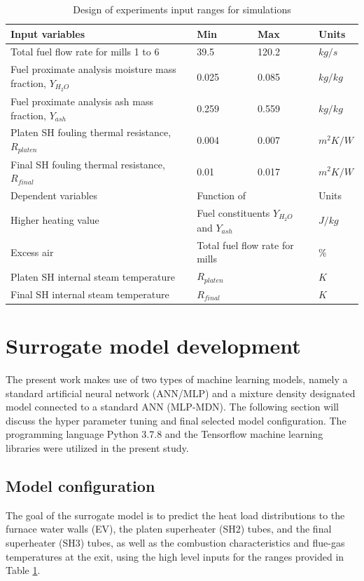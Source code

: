 \documentclass[a4paper,fleqn]{cas-dc}
\begin{document}
\begin{table}[h!]
\caption{Design of experiments input ranges for  simulations}\label{tbl_doe}
\begin{tabular*}{\tblwidth}{p{}p{}p{}p{}}
\toprule
 Input variables& Min& Max& Units \\ %
\midrule
 Total fuel flow rate for mills 1 to 6 & 39.5 & 120.2 & $kg/s$ \\
 Fuel proximate analysis moisture mass fraction, $Y_{H_2O}$ & 0.025 & 0.085 & $kg/kg$ \\
 Fuel proximate analysis ash mass fraction, $Y_{ash}$  & 0.259 & 0.559 & $kg/kg$ \\
 Platen SH fouling thermal resistance, $R_{platen}$  & 0.004 & 0.007 & $m^2K/W$ \\
 Final SH fouling thermal resistance, $R_{final}$  &0.01 & 0.017 & $m^2K/W$ \\
\midrule
Dependent variables& \multicolumn{2}{l}{Function of}& Units\\
\midrule
Higher heating value&\multicolumn{2}{l}{Fuel constituents $Y_{H_2O}$ and $Y_{ash}$}&$J/kg$\\
Excess air & \multicolumn{2}{l}{Total fuel flow rate for mills} & $\%$\\
Platen SH internal steam temperature& \multicolumn{2}{l}{$R_{platen}$} & $K$\\
Final SH internal steam temperature& \multicolumn{2}{l}{$R_{final}$} & $K$\\
\bottomrule
\end{tabular*}
\end{table}
\section{Surrogate model development}
The present work makes use of two types of machine learning models, namely a standard artificial neural network (ANN/MLP) and a mixture density designated model connected to a standard ANN (MLP-MDN). The following section will discuss the hyper parameter tuning and final selected model configuration. The programming language Python 3.7.8 and the Tensorflow machine learning libraries were utilized in the present study. 
\subsection{Model configuration}
The goal of the surrogate model is to predict the heat load distributions to the furnace water walls (EV), the platen superheater (SH2) tubes, and the final superheater (SH3) tubes, as well as the combustion characteristics and flue-gas temperatures at the exit, using the high level inputs for the ranges provided in Table \ref{tbl_doe}.\\
\end{document}
